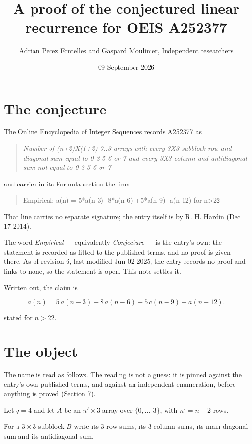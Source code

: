 \documentclass[11pt]{article}
\title{A proof of the conjectured linear recurrence for OEIS A252377}
\author{Adrian Perez Fontelles and Gaspard Moulinier, Independent researchers}
\date{09 September 2026}
\theoremstyle{definition}
\begin{document}
\maketitle
\section{The conjecture}

The Online Encyclopedia of Integer Sequences records \href{https://oeis.org/A252377}{A252377} as

\begin{quote}\itshape Number of (n+2)X(1+2) 0..3 arrays with every 3X3 subblock row and diagonal sum equal to 0 3 5 6 or 7 and every 3X3 column and antidiagonal sum not equal to 0 3 5 6 or 7\end{quote}

and carries in its Formula section the line:

\begin{quote}\ttfamily Empirical: a(n) = 5*a(n-3) -8*a(n-6) +5*a(n-9) -a(n-12) for n>22\end{quote}

That line carries no separate signature; the entry itself is by R. H. Hardin (Dec 17 2014).

The word {\itshape Empirical} --- equivalently {\itshape Conjecture} --- is the entry's own: the statement is recorded as fitted to the published terms, and no proof is given there. As of revision 6, last modified Jun 02 2025, the entry records no proof and links to none, so the statement is open. This note settles it.

Written out, the claim is

\[a(n) = 5\,a(n-3) - 8\,a(n-6) + 5\,a(n-9) - a(n-12).\]

stated for $n > 22$.

\section{The object}

The name is read as follows. The reading is not a guess: it is pinned against the entry's own published terms, and against an independent enumeration, before anything is proved (Section 7).

Let $q = 4$ and let $A$ be an $n' \times 3$ array over $\{0,\dots,3\}$, with $n' = n + 2$ rows.

For a $3\times3$ subblock $B$ write its 3 row sums, its 3 column sums, its main-diagonal sum and its antidiagonal sum.
\end{document}
